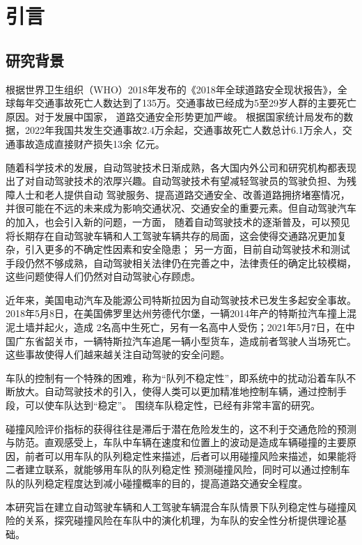 
\chapter{引言}

\section{研究背景}

根据世界卫生组织（WHO）2018年发布的《2018年全球道路安全现状报告》，全球每年交通事故死亡人数达到了135万。交通事故已经成为5至29岁人群的主要死亡原因。对于发展中国家，
道路交通安全形势更加严峻。\cite{WHO} 根据国家统计局发布的数据，2022年我国共发生交通事故2.4万余起，交通事故死亡人数总计6.1万余人，交通事故造成直接财产损失13余
亿元。\cite{stats_gov}

随着科学技术的发展，自动驾驶技术日渐成熟，各大国内外公司和研究机构都表现出了对自动驾驶技术的浓厚兴趣。自动驾驶技术有望减轻驾驶员的驾驶负担、为残障人士和老人提供自动
驾驶服务、提高道路交通安全、改善道路拥挤堵塞情况，并很可能在不远的未来成为影响交通状况、交通安全的重要元素。但自动驾驶汽车的加入，也会引入新的问题，一方面，
随着自动驾驶技术的逐渐普及，可以预见将长期存在自动驾驶车辆和人工驾驶车辆共存的局面，这会使得交通路况更加复杂，引入更多的不确定性因素和安全隐患；
另一方面，目前自动驾驶技术和测试手段仍然不够成熟，自动驾驶相关法律仍在完善之中，法律责任的确定比较模糊，这些问题使得人们仍然对自动驾驶心存顾虑。

近年来，美国电动汽车及能源公司特斯拉因为自动驾驶技术已发生多起安全事故。2018年5月8日，在美国佛罗里达州劳德代尔堡，一辆2014年产的特斯拉汽车撞上混泥土墙并起火，造成
2名高中生死亡，另有一名高中人受伤；2021年5月7日，在中国广东省韶关市，一辆特斯拉汽车追尾一辆小型货车，造成前者驾驶人当场死亡。这些事故使得人们越来越关注自动驾驶的安全问题。

车队的控制有一个特殊的困难，称为“队列不稳定性”，即系统中的扰动沿着车队不断放大。自动驾驶技术的引入，使得人类可以更加精准地控制车辆，通过控制手段，可以使车队达到“稳定”。
围绕车队稳定性，已经有非常丰富的研究。

碰撞风险评价指标的获得往往是滞后于潜在危险发生的，这不利于交通危险的预测与防范。直观感受上，车队中车辆在速度和位置上的波动是造成车辆碰撞的主要原因，前者可以用车队的队列稳定性来描述，后者可以用碰撞风险来描述，如果能将二者建立联系，就能够用车队的队列稳定性
预测碰撞风险，同时可以通过控制车队的队列稳定程度达到减小碰撞概率的目的，提高道路交通安全程度。

本研究旨在建立自动驾驶车辆和人工驾驶车辆混合车队情景下队列稳定性与碰撞风险的关系，探究碰撞风险在车队中的演化机理，为车队的安全性分析提供理论基础。




